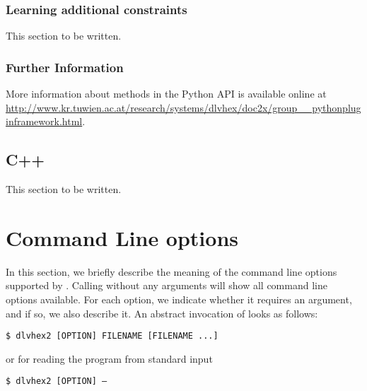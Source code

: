 \documentclass[a4paper, titlepage]{article}
\newcommand\leftaligned[1]{\par \smallskip \noindent \qquad #1 \smallskip \par}
\newcommand{\tobewritten}[0]{This section to be written.}
\begin{document}
\subsubsection{Learning additional constraints}

\tobewritten

\subsubsection{Further Information}

More information about methods in the \dlvhex{}
Python API is available online at
\url{http://www.kr.tuwien.ac.at/research/systems/dlvhex/doc2x/group__pythonpluginframework.html}.

\subsection{C++}

\tobewritten

\section{Command Line options}
\label{sec:commandline}
In this section, we briefly describe the meaning of the command line options supported by \dlvhex{}. 
Calling \dlvhex{} without any arguments will show all 
command line options available.
For each option, we indicate whether it requires an argument, and if so, we also describe it.
An abstract invocation of \dlvhex{} looks as follows:

\leftaligned{\texttt{\$ dlvhex2 [OPTION] FILENAME [FILENAME ...]}}
\noindent
or for reading the program from standard input
\leftaligned{\texttt{\$ dlvhex2 [OPTION] --}}
\end{document}
